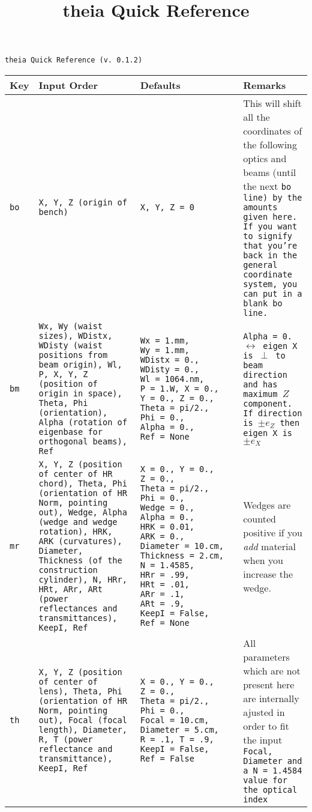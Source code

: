 \documentclass[a4paper, landscape]{article}
\title{theia Quick Reference}
\begin{document}
\begin{center}
\large \tt{theia} Quick Reference (v. 0.1.2)
\end{center}



\begin{tabular}{| p{.6cm} | p{8cm}| p{8cm} | p{8cm} |}
\hline
\textbf{Key} & \textbf{Input Order} & \textbf{Defaults} & \textbf{Remarks} \\ \hline \hline
\tt{bo} & \tt{X}, \tt{Y}, \tt{Z} (origin of bench) & \tt{X}, \tt{Y}, \tt{Z}~=~0 & This will shift all the coordinates of the following optics and beams (until the next \tt{bo} line) by the amounts given here. If you want to signify that you're back in the general coordinate system, you can put in a blank \tt{bo} line.\\ \hline

\tt{bm} & \tt{Wx}, \tt{Wy} (waist sizes), \tt{WDistx}, \tt{WDisty} (waist positions from beam origin), \tt{Wl}, \tt{P}, \tt{X}, \tt{Y}, \tt{Z} (position of origin in space), \tt{Theta}, \tt{Phi} (orientation), \tt{Alpha} (rotation of eigenbase for orthogonal beams), \tt{Ref}  & \tt{Wx}~=~1.mm, \tt{Wy}~=~1.mm, \tt{WDistx}~=~0., \tt{WDisty}~=~0., \tt{Wl}~=~1064.nm, \tt{P}~=~1.W, \tt{X}~=~0., \tt{Y}~=~0., \tt{Z}~=~0., \tt{Theta}~=~pi/2., \tt{Phi}~=~0., \tt{Alpha}~=~0., \tt{Ref}~=~None & \tt{Alpha = 0.} $\leftrightarrow$ eigen X is $\perp$ to beam direction and has maximum $Z$ component. If direction is $\pm e_Z$ then eigen X is $\pm e_X$\\ \hline

\tt{mr} & \tt{X}, \tt{Y}, \tt{Z} (position of center of HR chord), \tt{Theta}, \tt{Phi} (orientation of HR Norm, pointing out), \tt{Wedge}, \tt{Alpha} (wedge and wedge rotation), \tt{HRK}, \tt{ARK} (curvatures), \tt{Diameter}, \tt{Thickness} (of the construction cylinder), \tt{N}, \tt{HRr}, \tt{HRt}, \tt{ARr}, \tt{ARt} (power reflectances and transmittances), \tt{KeepI},  \tt{Ref} & \tt{X}~=~0., \tt{Y}~=~0., \tt{Z}~=~0., \tt{Theta}~=~pi/2., \tt{Phi}~=~0., \tt{Wedge}~=~0., \tt{Alpha}~=~0., \tt{HRK}~=~0.01, \tt{ARK}~=~0., \tt{Diameter}~=~10.cm, \tt{Thickness}~=~2.cm, \tt{N}~=~1.4585, \tt{HRr}~=~.99, \tt{HRt}~=~.01, \tt{ARr}~=~.1, \tt{ARt}~=~.9, \tt{KeepI}~=~False, \tt{Ref}~=~None & Wedges are counted positive if you \textit{add} material when you increase the wedge.\\ \hline

\tt{th} & \tt{X}, \tt{Y}, \tt{Z} (position of center of lens), \tt{Theta}, \tt{Phi} (orientation of HR Norm, pointing out), \tt{Focal} (focal length),  \tt{Diameter}, \tt{R}, \tt{T} (power reflectance and transmittance), \tt{KeepI}, \tt{Ref} & \tt{X}~=~0., \tt{Y}~=~0., \tt{Z}~=~0., \tt{Theta}~=~pi/2., \tt{Phi}~=~0., \tt{Focal}~=~10.cm,  \tt{Diameter}~=~5.cm, \tt{R}~=~.1, \tt{T}~=~.9, \tt{KeepI}~=~False,  \tt{Ref}~=~False & All parameters which are not present here are internally ajusted in order to fit the input \tt{Focal}, \tt{Diameter} and a \tt{N}~=~1.4584 value for the optical index\\ \hline


\end{tabular}
\end{document}
